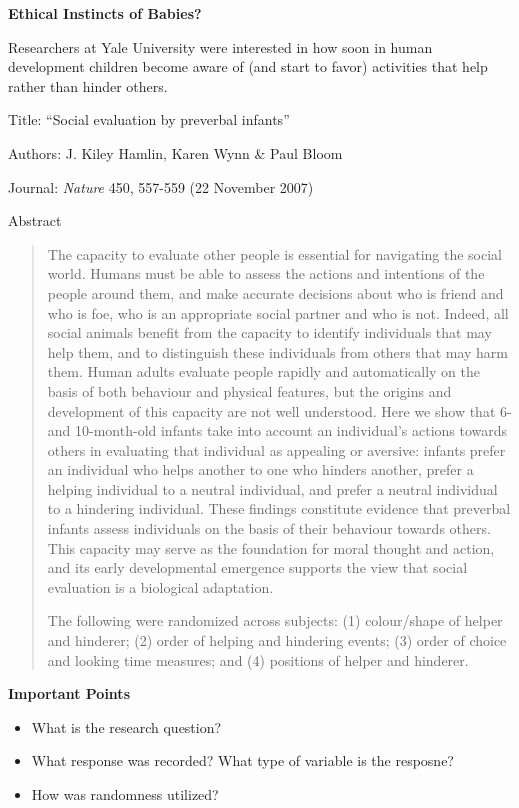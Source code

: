 \def\theTopic{Reading 3}

\begin{center}
{\bf {\large Ethical Instincts of Babies?}}
\end{center}

Researchers at Yale University were interested in how soon in human
development children become aware of (and start to favor) activities
that help rather than hinder others.


Title: ``Social evaluation by preverbal infants''

Authors: J. Kiley Hamlin, Karen Wynn \& Paul Bloom

Journal: {\it Nature} 450, 557-559 (22 November 2007) 

Abstract

\begin{quotation}
  The capacity to evaluate other people is essential for navigating the
social world. Humans must be able to assess the actions and intentions
of the people around them, and make accurate decisions about who is
friend and who is foe, who is an appropriate social partner and who is
not. Indeed, all social animals benefit from the capacity to identify
individuals  that may help them, and to distinguish these
individuals from others that may harm them. Human adults evaluate
people rapidly and automatically on the basis of both behaviour and
physical features, but the origins and
development of this capacity are not well understood. Here we show
that 6- and 10-month-old infants take into account an individual's
actions towards others in evaluating that individual as appealing or
aversive: infants prefer an individual who helps another to one who
hinders another, prefer a helping individual to a neutral individual,
and prefer a neutral individual to a hindering individual. These
findings constitute evidence that preverbal infants assess individuals
on the basis of their behaviour towards others. This capacity may
serve as the foundation for moral thought and action, and its early
developmental emergence supports the view that social evaluation is a
biological adaptation. 



The following were randomized across subjects:
(1) colour/shape of helper and hinderer; (2) order of helping and
hindering events; (3) order of choice and looking time
measures; and (4) positions of helper and hinderer. 
\end{quotation}

\newpage

 \begin{center}
   {\large\bf Important Points}
 \end{center}
 \begin{itemize}
 \item What is the research question?\vspace{1in}
 \item What response was recorded? What type of variable is the
   resposne? \vspace{1in}
 \item How was randomness utilized?\vspace{1in}

 \end{itemize}





